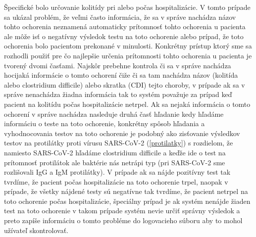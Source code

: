 Špecifické bolo určovanie kolitídy pri alebo počas hospitalizácie. V tomto prípade sa ukázal problém, že veľmi často informácia, že sa v správe nachádza názov tohto ochorenia neznamená automaticky prítomnosť tohto ochorenia u pacienta ale môže isť o negatívny výsledok testu na toto ochorenie alebo prípad, že toto ochorenia bolo pacientom prekonané v minulosti. Konkrétny prístup ktorý sme sa rozhodli použiť pre čo najlepšie určenia prítomnosti tohto ochorenia u pacienta je tvorený dvomi časťami. Najskôr prebehne kontrola či sa v správe nachádza hocijaká informácie o tomto ochorení čiže či sa tam nachádza názov (kolitída alebo clostridium difficile) alebo skratka (CDI) tejto choroby, v prípade ak sa v správe nenachádza žiadna informácia tak to systém považuje za prípad keď pacient na kolitídu počas hospitalizácie netrpel. Ak sa nejaká informácia o tomto ochorení v správe nachádza nasleduje druhá časť hľadanie kedy hľadáme informáciu o teste na toto ochorenie, konkrétny spôsob hľadania a vyhodnocovania testov na toto ochorenie je podobný ako zisťovanie výsledkov testov na protilátky proti vírusu SARS-CoV-2 (\ref{protilatky}) s rozdielom, že namiesto SARS-CoV-2 hľadáme clostridium difficile a keďže ide o test na prítomnosť protilátok ale baktérie nás netrápi typ (pri SARS-CoV-2 sme rozlišovali IgG a IgM protilátky). V prípade ak sa nájde pozitívny test tak tvrdíme, že pacient počas hospitalizácie na toto ochorenie trpel, naopak v prípade, že všetky nájdené testy sú negatívne tak tvrdíme, že pacient netrpel na toto ochorenie počas hospitalizácie, špeciálny prípad je ak systém nenájde žiaden test na toto ochorenie v takom prípade systém nevie určiť správny výsledok a preto zapíše informáciu o tomto probléme do logovacieho súboru aby to mohol užívateľ skontrolovať.  

    
